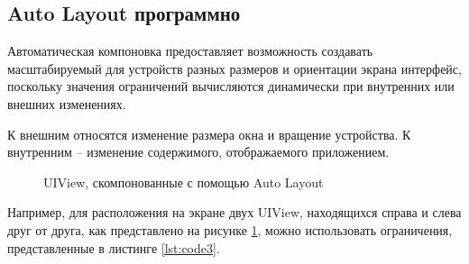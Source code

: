 \subsection{Auto Layout программно}

Автоматическая компоновка предоставляет возможность создавать масштабируемый для устройств разных размеров и ориентации экрана интерфейс, поскольку значения ограничений вычисляются динамически при внутренних или внешних изменениях. 

К внешним относятся изменение размера окна и вращение устройства.
К внутренним -- изменение содержимого, отображаемого приложением.

\begin{figure}[h!]
	\caption{UIView, скомпонованные с помощью Auto Layout}
	\label{fig:autolayout}
\end{figure}

Например, для расположения на экране двух UIView, находящихся справа и слева друг от друга, как представлено на рисунке \ref{fig:autolayout}, можно использовать ограничения, представленные в листинге \ref{lst:code3}.

